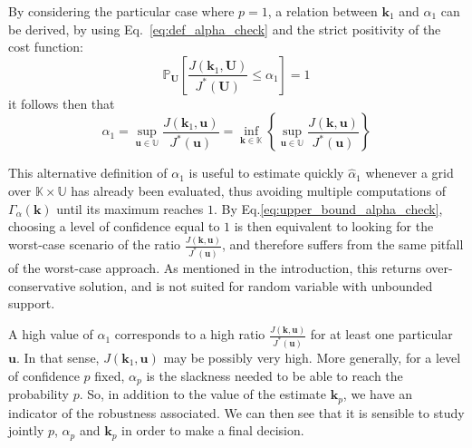\documentclass[preprint, 1p]{elsarticle}
\newcommand{\Prob}{\mathbb{P}}
\newcommand{\checkap}{{\alpha}_p}
\newcommand{\checka}{{\alpha}}
\newcommand{\checkk}{\mathbf{k}}
\newcommand{\checkkp}{{\mathbf{k}}_p}
\newcommand{\Kspace}{\mathbb{K}}
\newcommand{\Uspace}{\mathbb{U}}
\begin{document}

By considering the particular case where $p=1$, a relation between $\checkk_1$ and $\checka_1$ can be derived, by using Eq.~\eqref{eq:def_alpha_check} and the strict positivity of the cost function:
\begin{equation}
  \label{eq:def_alpha1}
  \Prob_{\mathbf{U}}\left[\frac{J(\mathbf{k}_1,\mathbf{U})}{ J^*(\mathbf{U}) } \leq \checka_1\right]=1
\end{equation}
it follows then that 
\begin{equation}
  \label{eq:upper_bound_alpha_check}
  \checka_1 = \sup_{\mathbf{u}\in\Uspace} \frac{J(\mathbf{k}_1,\mathbf{u})}{J^*(\mathbf{u})} =  \inf_{\mathbf{k}\in\Kspace} \left\{ \sup_{\mathbf{u}\in\Uspace} \frac{J(\mathbf{k},\mathbf{u})}{J^*(\mathbf{u})} \right\} 
\end{equation}

This alternative definition of $\checka_1$ is useful to estimate quickly $\hat{\checka}_1$ whenever a grid over $\mathbb{K}\times\mathbb{U}$ has already been evaluated, thus avoiding multiple computations of $\Gamma_{\alpha}(\mathbf{k})$ until its maximum reaches $1$. By Eq.\eqref{eq:upper_bound_alpha_check}, choosing a level of confidence equal to $1$ is then equivalent to looking for the worst-case scenario of the ratio $\frac{J(\mathbf{k},\mathbf{u})}{J^*(\mathbf{u})}$, and therefore suffers from the same pitfall of the worst-case approach. As mentioned in the introduction, this returns over-conservative solution, and is not suited for random variable with unbounded support.


A high value of $\checka_1$ corresponds to a high ratio $\frac{J(\mathbf{k},\mathbf{u})}{J^*(\mathbf{u})}$ for at least one particular $\mathbf{u}$. In that sense, $J(\checkk_1,\mathbf{u})$ may be possibly very high.
More generally, for a level of confidence $p$ fixed, $\checkap$ is the slackness needed to be able to reach the probability $p$. So, in addition to the value of the estimate $\checkkp$, we have an indicator of the robustness associated. We can then see that it is sensible to study jointly $p$, $\checkap$ and $\checkkp$ in order to make a final decision.
\end{document}
